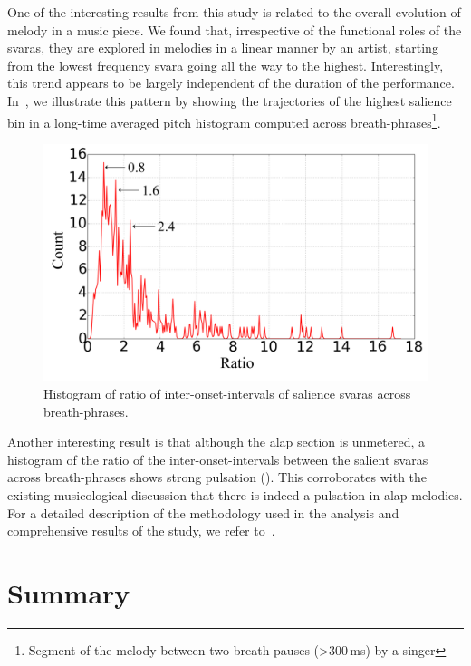 One of the interesting results from this study is related to the overall evolution of melody in a music piece. We found that, irrespective of the functional roles of the \glspl{svara}, they are explored in melodies in a linear manner by an artist, starting from the lowest frequency \gls{svara} going all the way to the highest. Interestingly, this trend appears to be largely independent of the duration of the performance. In~, we illustrate this pattern by showing the trajectories of the highest salience bin in a long-time averaged pitch histogram computed across breath-phrases\footnote{Segment of the melody between two breath pauses (>300\,ms) by a singer}. 

\begin{figure}
	\begin{center}
		\includegraphics[width=\figSizeSeventy]{ch08_applications/figures/Fig-8.pdf}
	\end{center}
	\caption{Histogram of ratio of inter-onset-intervals of salience \glspl{svara} across breath-phrases.}
	\label{fig:pulsation_example}
\end{figure}

Another interesting result is that although the \gls{alap} section is unmetered, a histogram of the ratio of the inter-onset-intervals between the salient \glspl{svara} across breath-phrases shows strong pulsation (). This corroborates with the existing musicological discussion that there is indeed a pulsation in \gls{alap} melodies. For a detailed description of the methodology used in the analysis and comprehensive results of the study, we refer to~\cite{kaustuv_ismir_2016}.

\section{Summary}
\label{sec:applications_summary}

